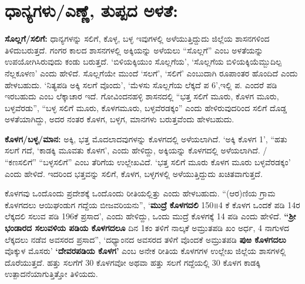 \section{ಧಾನ್ಯಗಳು/ಎಣ್ಣೆ, ತುಪ್ಪದ ಅಳತೆ:}

\textbf{ಸೊಲ್ಲಗೆ/ಸಲಿಗೆ:} ಧಾನ್ಯಗಳನ್ನು ಸಲಿಗೆ, ಕೊಳ್ಳ, ಬಳ್ಳ ಇವುಗಳಲ್ಲಿ ಅಳೆಯುತ್ತಿದ್ದುದು ಜಿಲ್ಲೆಯ ಶಾಸನಗಳಿಂದ ತಿಳಿದುಬರುತ್ತದೆ. ಗಂಗರ ಕಾಲದ ಶಾಸನಗಳಲ್ಲಿ ಅಕ್ಕಿಯನ್ನು ಅಳೆಯಲು “ಸೊಲ್ಲಗೆ” ಎಂಬ ಅಳತೆಯನ್ನು ಉಪಯೋಗಿಸಿರುವುದು ಕಂಡು ಬರುತ್ತದೆ. ‘ಬಿಳಿಯಕ್ಕಿಯುಂ ಸೊಲ್ಲಗೆಯ’, ‘ಸೊಲ್ಲಗೆಯ ಬಿಳಿಯಕ್ಕಿಯೆಮ್ಬುದಿಲ್ಪ ನೆಲ್ಲಕೂಳಣ’ ಎಂದು ಹೇಳಿದೆ. ಸೊಲ್ಲಗೆಯೇ ಮುಂದೆ ‘ಸಲಗೆ’, ‘ಸಲಿಗೆ’ ಎಂಬುದಾಗಿ ರೂಪಾಂತರ ಹೊಂದಿದೆ ಎಂದು ಹೇಳಬಹುದು. ‘ನಿತ್ಯಪಡಿ ಅಕ್ಕಿ ಸಲಗೆ ವೊಂದು’, ‘ಮೆಳಸು ಸೊಲ್ಲಗೆಯ ಲೆಕ್ಕದೆ ಪ 6’,ಇಲ್ಲಿ ಪ. ಎಂದರೆ ಪಡಿ ಇರಬಹುದು ಎಂಬ ಲೆಕ್ಕಾಚಾರ ಇದೆ. ಗೋವಿಂದನಹಳ್ಳಿ ಶಾಸನದಲ್ಲಿ “ಭತ್ತ ಸಲಿಗೆ ಮೂರು, ಕೊಳಗ ಮೂರು, ಬಳ್ಳವೆರಡು”, “ಬಳ್ಳ ಸಲಿಗೆ ಮೂರು, ಕೊಳಗಮೂರು, ಬಳ್ಳವೆರಡಕ್ಕಂ” ಎಂದು ಹೇಳಿರುವುದರಿಂದ ಸಲಿಗೆ ದೊಡ್ಡ ಅಳತೆಯಾಗಿದ್ದು, ಅದರ ನಂತರ ಕೊಳಗ, ಬಳ್ಳಗ, ಮಾನಗಳು ಬರುತ್ತವೆಂದು ಹೇಳಬಹುದು.

\newpage

\textbf{ಕೊಳಗ/ಬಳ್ಳ/ಮಾನ:} ಅಕ್ಕಿ, ಭತ್ತ ಮೊದಲಾದವುಗಳನ್ನು ಕೊಳಗದಲ್ಲಿ ಅಳೆಯಲಾಗಿದೆ. ‘ಅಕ್ಕಿ ಕೊಳಗ 1’, “ಹತು ಸಲಗೆ ಗದೆ, ‘ಕಾಡಕ್ಕಿ ಮೂವತು ಕೊಳಗ’, ಎಂದು ಹೇಳಿದ್ದು, ಅಕ್ಕಿಯನ್ನು ಕೊಳಗದಲ್ಲಿ ಅಳೆಯಲಾಗಿದೆ. / “ಕಣಸಲಿಗೆ” “ಬಳ್ಳಸಲಿಗೆ” ಎಂಬ ತೆರಿಗೆಯ ಉಲ್ಲೇಖವಿದೆ. ‘ಭತ್ತ ಸಲಿಗೆ ಮೂರು ಕೊಳಗ ಮೂರು ಬಳ್ಳವೆರಡಕ್ಕಂ’ ಎಂದು ಹೇಳಿದೆ. ಇದರಿಂದ ಭತ್ತವನ್ನು ಸಲಿಗೆ, ಕೊಳಗ, ಬಳ್ಳಗಳಲ್ಲಿ ಅಳೆಯುತ್ತಿದ್ದುದು ಖಚಿತವಾಗುತ್ತದೆ.

ಕೊಳಗವು ಒಂದೊಂದು ಪ್ರದೇಶಕ್ಕೆ ಒಂದೊಂದು ರೀತಿಯಲ್ಲಿತ್ತು ಎಂದು ಹೇಳಬಹುದು. “(ಆರ)ಣಿಯ ಗ್ರಾಮ ಕೊಳಗದಲು ಆಯಿಘಂಡುಗ ಗದ್ದೆಯ ಬೀಜವರಿಯನು”, ‘\textbf{ಮುದ್ರೆ ಕೊಳಗದಲಿ} 150॥4 ಕೆ ಕೊಳಗ ಒಂದಕೆ ಪಡಿ 14ರ ಲೆಕ್ಕದಲಿ ಸಲುವ ಪಡಿ 196ಕೆ ಪ್ರಸಾದ’, ಎಂದು ಹೇಳಿದ್ದು, ಒಂದು ಮುದ್ರೆ ಕೊಳಗಕ್ಕೆ 14 ಪಡಿ ಎಂದು ಹೇಳಿದೆ. \textbf{“ಶ‍್ರೀ} \textbf{ಭಂಡಾರದ ಸಲುವಳಿಯ ಪಡಿಯ ಕೊಳಗದಲೂ} ದಿನ 1ಕಂ ತಳಿಗೆ ನಾಲ್ಕಕೆ ಅಮ್ರುತಪಡಿ ಖಂ ಅರ್ಧ, 4 ನಾಗುಳದ ಲೆಕ್ಕದಲು ನಡೆವ ಅವಸರದ ಪ್ರಸಾದ”, ‘ದಧ್ಯಾಂನದ ಅವಸರದ ತಳಿಗೆ ವೊಂದಕೆ ಅಮ್ರುತಪಡಿ \textbf{ಪುಱ ಕೊಳಗದಲು} ವೊಕ್ಕುಳ ಮೊಸರು’ \textbf{‘ದೇವರಪಡಿಯ ಕೊಳಗ’} ಎಂಬ ಅನೇಕ ರೀತಿಯ ಕೊಳಗಗಳ ಉಲ್ಲೇಖ ಜಿಲ್ಲೆಯ ಶಾಸಗಳಲ್ಲಿ ದೊರೆಯುತ್ತದೆ. ಹತ್ತು ಸಲಗೆಗೆ 30 ಕೊಳಗವೋ ಅಥವಾ ಹತ್ತು ಸಲಗೆ ಗದ್ದೆಯಲ್ಲಿ 30 ಕೊಳಗ ಕಾಡಕ್ಕಿ ಉತ್ಪಾದನೆಯಾಗುತ್ತಿತ್ತೋ ತಿಳಿಯದು.

